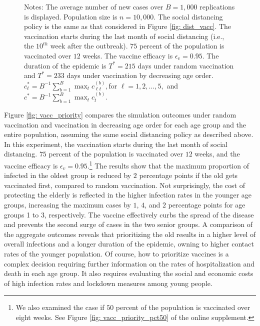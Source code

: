\documentclass[12pt]{article}
\begin{document}
\begin{figure}[htp]
\begin{center}
\end{center}

%

\vspace{-0.2cm}%
Notes: The average number of new cases over $B=1,000$ replications is
displayed. Population size is $n=10,000$. The social distancing policy is the
same as that considered in Figure \ref{fig: dist_vacc}. The vaccination starts
during the last month of social distancing (i.e., the $10^{th}$ week after the
outbreak). $75$ percent of the population is vaccinated over $12$ weeks. The
vaccine efficacy is $\epsilon_{v}=0.95.$ The duration of the epidemic is
$T^{\ast}=215$ days under random vaccination and $T^{\ast}=233$ days under
vaccination by decreasing age order. $c_{\ell}^{\ast}=B^{-1}\sum_{b=1}^{B}%
\max_{t}c_{\ell t}^{(b)},$for $\ell=1,2,\ldots,5,$ and $c^{\ast}=B^{-1}%
\sum_{b=1}^{B}\max_{t}c_{t}^{(b)}$.%

\end{figure}%


Figure \ref{fig: vacc_priority} compares the simulation outcomes under random
vaccination and vaccination in decreasing age order for each age group and the
entire population, assuming the same social distancing policy as described
above. In this experiment, the vaccination starts during the last month of
social distancing. $75$ percent of the population is vaccinated over $12$
weeks, and the vaccine efficacy is $\epsilon_{v}=0.95$.\footnote{We also
examined the case if $50$ percent of the population is vaccinated over eight
weeks. See Figure \ref{fig: vacc_priority_pct50} of the online supplement.}
The results show that the maximum proportion of infected in the oldest group
is reduced by $2$ percentage points if the old gets vaccinated first, compared
to random vaccination. Not surprisingly, the cost of protecting the elderly is
reflected in the higher infection rates in the younger age groups, increasing
the maximum cases by $1$, $4$, and $2$ percentage points for age groups 1 to
3, respectively. The vaccine effectively curbs the spread of the disease and
prevents the second surge of cases in the two senior groups. A comparison of
the aggregate outcomes reveals that prioritizing the old results in a higher
level of overall infections and a longer duration of the epidemic, owning to
higher contact rates of the younger population. Of course, how to prioritize
vaccines is a complex decision requiring further information on the rates of
hospitalization and death in each age group. It also requires evaluating the
social and economic costs of high infection rates and lockdown measures among
young people.
\end{document}
